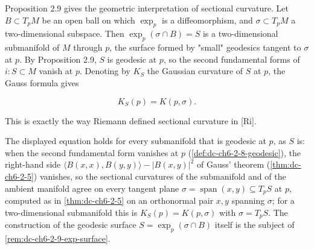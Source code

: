 \begin{remark}
  \label{rem:dc-ch6-2-9-interpretation}
  \leanok
  Proposition 2.9 gives the geometric interpretation of sectional curvature. Let
  $B\subset T_pM$ be an open ball on which $\exp_p$ is a diffeomorphism, and
  $\sigma\subset T_pM$ a two-dimensional subspace. Then $\exp_p(\sigma\cap B)=S$ is a
  two-dimensional submanifold of $M$ through $p$, the surface formed by "small"
  geodesics tangent to $\sigma$ at $p$. By Proposition 2.9, $S$ is geodesic at $p$,
  so the second fundamental forms of $i:S\subset M$ vanish at $p$. Denoting by $K_S$
  the Gaussian curvature of $S$ at $p$, the Gauss formula gives

  $$
  K_S(p)=K(p,\sigma).
  $$

  This is exactly the way Riemann defined sectional curvature in [Ri].

  The displayed equation holds for every submanifold that is geodesic at $p$,
  as $S$ is: when the second fundamental form vanishes at $p$
  (\cref{def:dc-ch6-2-8-geodesic}), the right-hand side
  $\langle B(x,x),B(y,y)\rangle-|B(x,y)|^2$ of Gauss' theorem
  (\cref{thm:dc-ch6-2-5}) vanishes, so the sectional curvatures of the
  submanifold and of the ambient manifold agree on every tangent plane
  $\sigma=\operatorname{span}(x,y)\subseteq T_pS$ at $p$, computed as in
  \cref{thm:dc-ch6-2-5} on an orthonormal pair $x,y$ spanning $\sigma$; for a
  two-dimensional submanifold this is $K_S(p)=K(p,\sigma)$ with $\sigma=T_pS$.
  The construction of the geodesic surface $S=\exp_p(\sigma\cap B)$ itself is
  the subject of \cref{rem:dc-ch6-2-9-exp-surface}.
\end{remark}

